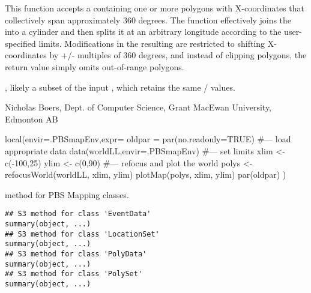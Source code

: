 \documentclass[letterpaper]{book}
\begin{document}
%
\begin{Details}\relax
This function accepts a  containing one or more polygons
with X-coordinates that collectively span approximately 360 degrees.
The function effectively joins the  into a cylinder and
then splits it at an arbitrary longitude according to the
user-specified limits.  Modifications in the resulting 
are restricted to shifting X-coordinates by +/- multiples of 360
degrees, and instead of clipping polygons, the return value simply
omits out-of-range polygons.
\end{Details}
%
\begin{Value}
, likely a subset of the input , which
retains the same / values.
\end{Value}
%
\begin{Author}\relax
Nicholas Boers, Dept. of Computer Science, Grant MacEwan University, Edmonton AB
\end{Author}
%
\begin{SeeAlso}\relax
{}
\end{SeeAlso}
%
\begin{Examples}
\begin{ExampleCode}
local(envir=.PBSmapEnv,expr={
  oldpar = par(no.readonly=TRUE)
  #--- load appropriate data
  data(worldLL,envir=.PBSmapEnv)
  #--- set limits
  xlim <- c(-100,25)
  ylim <- c(0,90)
  #--- refocus and plot the world
  polys <- refocusWorld(worldLL, xlim, ylim)
  plotMap(polys, xlim, ylim)
  par(oldpar)
})
\end{ExampleCode}
\end{Examples}
%
\begin{Description}\relax
{} method for PBS Mapping classes.
\end{Description}
%
\begin{Usage}
\begin{verbatim}
## S3 method for class 'EventData'
summary(object, ...)
## S3 method for class 'LocationSet'
summary(object, ...)
## S3 method for class 'PolyData'
summary(object, ...)
## S3 method for class 'PolySet'
summary(object, ...)
\end{verbatim}
\end{Usage}
\end{document}

